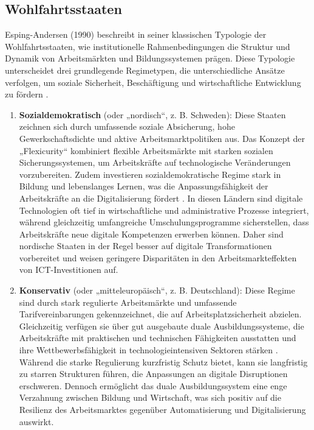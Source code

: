 \subsection{Wohlfahrtsstaaten} 

Esping-Andersen (1990) beschreibt in seiner klassischen Typologie der Wohlfahrtsstaaten, wie 
institutionelle Rahmenbedingungen die Struktur und Dynamik von Arbeitsmärkten und 
Bildungssystemen prägen. Diese Typologie unterscheidet drei grundlegende Regimetypen, die 
unterschiedliche Ansätze verfolgen, um soziale Sicherheit, Beschäftigung und wirtschaftliche 
Entwicklung zu fördern \parencite[S. 27f]{espingandersen1990thethree}.

\begin{enumerate}
    \item \textbf{Sozialdemokratisch} (oder „nordisch“, z. B. Schweden): Diese Staaten 
    zeichnen sich durch umfassende soziale Absicherung, hohe Gewerkschaftsdichte und aktive 
    Arbeitsmarktpolitiken aus. Das Konzept der „Flexicurity“ kombiniert flexible Arbeitsmärkte 
    mit starken sozialen Sicherungssystemen, um Arbeitskräfte auf technologische Veränderungen 
    vorzubereiten. Zudem investieren sozialdemokratische Regime stark in Bildung und 
    lebenslanges Lernen, was die Anpassungsfähigkeit der Arbeitskräfte an die Digitalisierung 
    fördert \parencite[S. 56]{espingandersen1990thethree}. In diesen Ländern sind digitale 
    Technologien oft tief in wirtschaftliche und administrative Prozesse integriert, während 
    gleichzeitig umfangreiche Umschulungsprogramme sicherstellen, dass Arbeitskräfte neue 
    digitale Kompetenzen erwerben können. Daher sind nordische Staaten in der Regel besser 
    auf digitale Transformationen vorbereitet und weisen geringere Disparitäten in den 
    Arbeitsmarkteffekten von \ac{ICT}-Investitionen auf.

    \item \textbf{Konservativ} (oder „mitteleuropäisch“, z. B. Deutschland): Diese 
    Regime sind durch stark regulierte Arbeitsmärkte und umfassende Tarifvereinbarungen 
    gekennzeichnet, die auf Arbeitsplatzsicherheit abzielen. Gleichzeitig verfügen sie über 
    gut ausgebaute duale Ausbildungssysteme, die Arbeitskräfte mit praktischen und technischen 
    Fähigkeiten ausstatten und ihre Wettbewerbsfähigkeit in technologieintensiven Sektoren stärken 
    \parencite[S. 78]{hall2001varieties}. Während die starke Regulierung kurzfristig Schutz 
    bietet, kann sie langfristig zu starren Strukturen führen, die Anpassungen an digitale 
    Disruptionen erschweren. Dennoch ermöglicht das duale Ausbildungssystem eine enge Verzahnung 
    zwischen Bildung und Wirtschaft, was sich positiv auf die Resilienz des Arbeitsmarktes 
    gegenüber Automatisierung und Digitalisierung auswirkt.


\end{enumerate}
